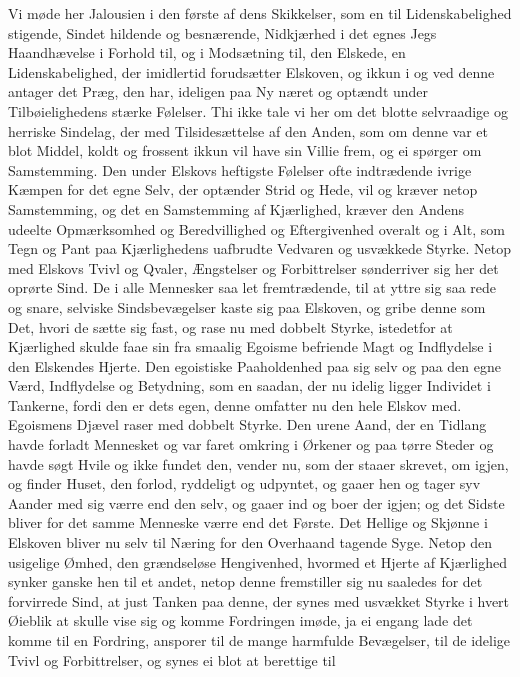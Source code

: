 \documentclass[12pt,a4paper]{book}
\newcommand{\apage}[1]{\marginnote{\footnotesize\textit{[#1]}}}
\begin{document}
Vi møde her Jalousien i den første af dens Skikkelser, som en til
Lidenskabelighed stigende, Sindet hildende og besnærende, Nidkjærhed i
det egnes Jegs Haandhævelse i Forhold til, og i Modsætning til, den
Elskede, en Lidenskabelighed, der imidlertid forudsætter Elskoven, og
ikkun i og ved denne antager det Præg, den har, ideligen paa Ny næret og
optændt under Tilbøielighedens stærke Følelser. Thi ikke tale vi her om
det blotte selvraadige og herriske Sindelag, der med Tilsidesættelse af
den Anden, som om denne var et blot Middel, koldt og frossent ikkun vil
have sin Villie frem, og ei spørger om Samstemming. Den under Elskovs
heftigste Følelser ofte indtrædende ivrige Kæmpen for det egne Selv, der
optænder Strid og Hede, vil og kræver netop Samstemming, og det en
Samstemming af Kjærlighed, kræver den Andens udeelte Opmærksomhed og
Beredvillighed og Eftergivenhed overalt og i Alt, som Tegn og Pant paa
Kjærlighedens uafbrudte Vedvaren og usvækkede Styrke. Netop med Elskovs
Tvivl og Qvaler, Ængstelser og Forbittrelser \apage{119} sønderriver sig her det
oprørte Sind. De i alle Mennesker saa let fremtrædende, til at yttre sig
saa rede og snare, selviske Sindsbevægelser kaste sig paa Elskoven, og
gribe denne som Det, hvori de sætte sig fast, og rase nu med dobbelt
Styrke, istedetfor at Kjærlighed skulde faae sin fra smaalig Egoisme
befriende Magt og Indflydelse i den Elskendes Hjerte. Den egoistiske
Paaholdenhed paa sig selv og paa den egne Værd, Indflydelse og Betydning,
som en saadan, der nu idelig ligger Individet i Tankerne, fordi den er
dets egen, denne omfatter nu den hele Elskov med. Egoismens Djævel raser
med dobbelt Styrke. Den urene Aand, der en Tidlang havde forladt
Mennesket og var faret omkring i Ørkener og paa tørre Steder og havde
søgt Hvile og ikke fundet den, vender nu, som der staaer skrevet, om
igjen, og finder Huset, den forlod, ryddeligt og udpyntet, og gaaer hen
og tager syv Aander med sig værre end den selv, og gaaer ind og boer der
igjen; og det Sidste bliver for det samme Menneske værre end det Første.
Det Hellige og Skjønne i Elskoven bliver nu selv til Næring for den
Overhaand tagende Syge. Netop den usigelige Ømhed, den grændseløse
Hengivenhed, hvormed et Hjerte af Kjærlighed synker ganske hen til et
andet, netop denne fremstiller sig nu saaledes for det forvirrede Sind,
at just Tanken paa denne, der synes med usvækket Styrke i hvert Øieblik
at skulle vise sig og komme Fordringen imøde, ja ei engang lade det
komme til en Fordring, ansporer til de mange \apage{120} harmfulde Bevægelser, til
de idelige Tvivl og Forbittrelser, og synes ei blot at berettige til
\end{document}
